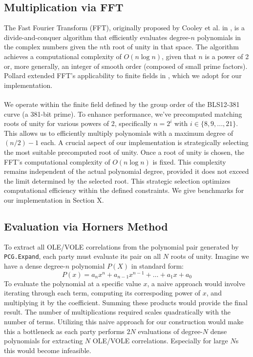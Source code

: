 \subsection{Multiplication via FFT}
The Fast Fourier Transform (FFT), originally proposed by Cooley et al. in \cite{cooley1965algorithm}, is a divide-and-conquer algorithm that efficiently evaluates degree-$n$ polynomials in the complex numbers given the $n$th root of unity in that space. The algorithm achieves a computational complexity of $O(n\log n)$, given that $n$ is a power of 2 or, more generally, an integer of smooth order (composed of small prime factors). Pollard extended FFT's applicability to finite fields in \cite{pollard1971fast}, which we adopt for our implementation. 
\\\\
We operate within the finite field defined by the group order of the BLS12-381 curve (a 381-bit prime). To enhance performance, we've precomputed matching roots of unity for various powers of 2, specifically $n=2^i$ with $i \in \{8, 9, ..., 21\}$. This allows us to efficiently multiply polynomials with a maximum degree of $(n/2)-1$ each. A crucial aspect of our implementation is strategically selecting the most suitable precomputed root of unity. Once a root of unity is chosen, the FFT's computational complexity of $O(n \log n)$ is fixed. This complexity remains independent of the actual polynomial degree, provided it does not exceed the limit determined by the selected root. This strategic selection optimizes computational efficiency within the defined constraints. We give benchmarks for our implementation in Section X.

\subsection{Evaluation via Horners Method}
\label{subsec:horner}
To extract all OLE/VOLE correlations from the polynomial pair generated by \texttt{PCG.Expand}, each party must evaluate its pair on all $N$ roots of unity. Imagine we have a dense degree-$n$ polynomial $P(X)$ in standard form:
$$
P(x) = a_n x^n + a_{n-1} x^{n-1} + \dots + a_1 x + a_0
$$
To evaluate the polynomial at a specific value $x$, a naive approach would involve iterating through each term, computing its correspoding power of $x$, and multiplying it by the coefficient. Summing these products would provide the final result. The number of multiplications required scales quadratically with the number of terms. Utilizing this naive approach for our construction would make this a bottleneck as each party performs $2N$ evaluations of degree-$N$ dense polynomials for extracting $N$ OLE/VOLE correlations. Especially for large $N$s this would become infeasible.

